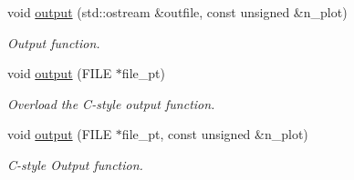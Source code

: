\begin{DoxyCompactItemize}
void \hyperlink{classoomph_1_1FluidInterfaceElement_a213b1a40132a9605ee8bd31c88b225e0}{output} (std\+::ostream \&outfile, const unsigned \&n\+\_\+plot)
\begin{DoxyCompactList}\small\item\em Output function. \end{DoxyCompactList}\item 
void \hyperlink{classoomph_1_1FluidInterfaceElement_ad39bb9862c7f76e07d5ac006a1209cf9}{output} (F\+I\+LE $\ast$file\+\_\+pt)
\begin{DoxyCompactList}\small\item\em Overload the C-\/style output function. \end{DoxyCompactList}\item 
void \hyperlink{classoomph_1_1FluidInterfaceElement_a57efd66ae07fab9e0cf98ac5f8eeb000}{output} (F\+I\+LE $\ast$file\+\_\+pt, const unsigned \&n\+\_\+plot)
\begin{DoxyCompactList}\small\item\em C-\/style Output function. \end{DoxyCompactList}\end{DoxyCompactItemize}
